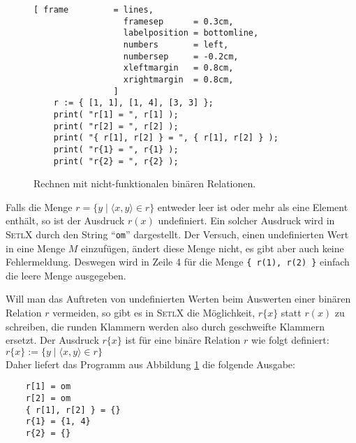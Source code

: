 \begin{figure}[!ht]
  \centering
\begin{Verbatim}[ frame         = lines, 
                  framesep      = 0.3cm, 
                  labelposition = bottomline,
                  numbers       = left,
                  numbersep     = -0.2cm,
                  xleftmargin   = 0.8cm,
                  xrightmargin  = 0.8cm,
                ]
    r := { [1, 1], [1, 4], [3, 3] };
    print( "r[1] = ", r[1] );
    print( "r[2] = ", r[2] );
    print( "{ r[1], r[2] } = ", { r[1], r[2] } );
    print( "r{1} = ", r{1} );
    print( "r{2} = ", r{2} );
\end{Verbatim} 
\vspace*{-0.3cm}
\caption{Rechnen mit nicht-funktionalen binären Relationen.}  \label{fig:buggy-function.stlx}
\end{figure} %

Falls die Menge  $r = \{ y \mid \langle x, y \rangle \in r \}$  entweder leer ist
oder mehr als eine Element enthält, so ist der Ausdruck $r(x)$ undefiniert.
Ein solcher Ausdruck wird in \textsc{SetlX} durch den String ``\texttt{om}'' dargestellt.
Der Versuch, einen undefinierten Wert in eine Menge $M$ einzufügen, ändert diese
Menge nicht, es gibt aber auch keine Fehlermeldung.  Deswegen wird in Zeile 4 für 
die Menge \texttt{\{ r(1), r(2) \}} einfach die leere Menge ausgegeben.

Will man das Auftreten von undefinierten Werten beim Auswerten einer binären
Relation $r$ vermeiden, so gibt es in \textsc{SetlX} die Möglichkeit, $r\{x\}$ statt
$r(x)$ zu schreiben, die runden Klammern werden also durch geschweifte Klammern ersetzt.  
Der Ausdruck $r\{x\}$  ist für eine binäre Relation $r$ wie folgt definiert: 
\\[0.2cm]
\hspace*{1.3cm}
 $r\{x\} := \{ y \mid \langle x, y \rangle \in r \}$ 
\\[0.2cm]
Daher liefert das Programm aus Abbildung \ref{fig:buggy-function.stlx} die folgende Ausgabe:
\begin{verbatim}
    r[1] = om
    r[2] = om
    { r[1], r[2] } = {}
    r{1} = {1, 4}
    r{2} = {}

\end{verbatim}

